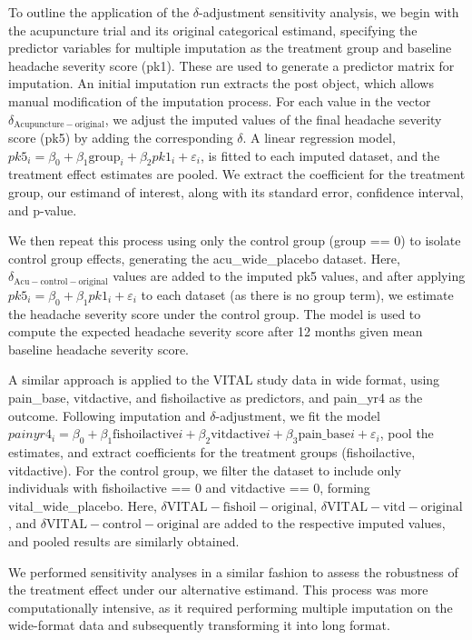 \documentclass{article}
\begin{document}
To outline the application of the \(\delta\)-adjustment sensitivity
analysis, we begin with the acupuncture trial and its original
categorical estimand, specifying the predictor variables for multiple
imputation as the treatment group and baseline headache severity score
(pk1). These are used to generate a predictor matrix for imputation. An
initial imputation run extracts the post object, which allows manual
modification of the imputation process. For each value in the vector
\(\delta_\mathrm{Acupuncture-original}\), we adjust the imputed values
of the final headache severity score (pk5) by adding the corresponding
\(\delta\). A linear regression model,
\(pk5_i = \beta_0 + \beta_1 \text{group}_i + \beta_2 pk1_i + \varepsilon_i\),
is fitted to each imputed dataset, and the treatment effect estimates
are pooled. We extract the coefficient for the treatment group, our
estimand of interest, along with its standard error, confidence
interval, and p-value.

We then repeat this process using only the control group (group == 0) to
isolate control group effects, generating the acu\_wide\_placebo
dataset. Here, \(\delta_\mathrm{Acu-control-original}\) values are added
to the imputed pk5 values, and after applying
\(pk5_i = \beta_0 + \beta_1pk1_i + \varepsilon_i\) to each dataset (as
there is no group term), we estimate the headache severity score under
the control group. The model is used to compute the expected headache
severity score after 12 months given mean baseline headache severity
score.

A similar approach is applied to the VITAL study data in wide format,
using pain\_base, vitdactive, and fishoilactive as predictors, and
pain\_yr4 as the outcome. Following imputation and
\(\delta\)-adjustment, we fit the model
\(painyr4_i = \beta_0 + \beta_1 \text{fishoilactive}i + \beta_2 \text{vitdactive}i + \beta_3 \text{pain\_base}i + \varepsilon_i\),
pool the estimates, and extract coefficients for the treatment groups
(fishoilactive, vitdactive). For the control group, we filter the
dataset to include only individuals with fishoilactive == 0 and
vitdactive == 0, forming vital\_wide\_placebo. Here,
\(\delta\mathrm{VITAL-fishoil-original}\),
\(\delta\mathrm{VITAL-vitd-original}\), and
\(\delta\mathrm{VITAL-control-original}\) are added to the respective
imputed values, and pooled results are similarly obtained.

We performed sensitivity analyses in a similar fashion to assess the
robustness of the treatment effect under our alternative estimand. This
process was more computationally intensive, as it required performing
multiple imputation on the wide-format data and subsequently
transforming it into long format.
\end{document}

